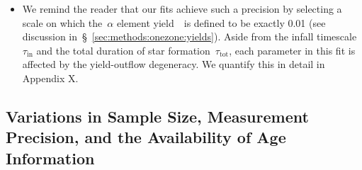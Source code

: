 \documentclass[ms.tex]{subfiles}
\begin{document}
\begin{itemize}
	\item We remind the reader that our fits achieve such a precision by
	selecting a scale on which the~$\alpha$ element yield~\yacc~is defined to
	be exactly 0.01 (see discussion in~\S~\ref{sec:methods:onezone:yields}).
	Aside from the infall timescale~$\tau_\text{in}$ and the total duration of
	star formation~$\tau_\text{tot}$, each parameter in this fit is affected by
	the yield-outflow degeneracy.
	We quantify this in detail in Appendix X.

\end{itemize}

\subsection{Variations in Sample Size, Measurement Precision, and the
Availability of Age Information}
\label{sec:mocks:variations}
\end{document}
